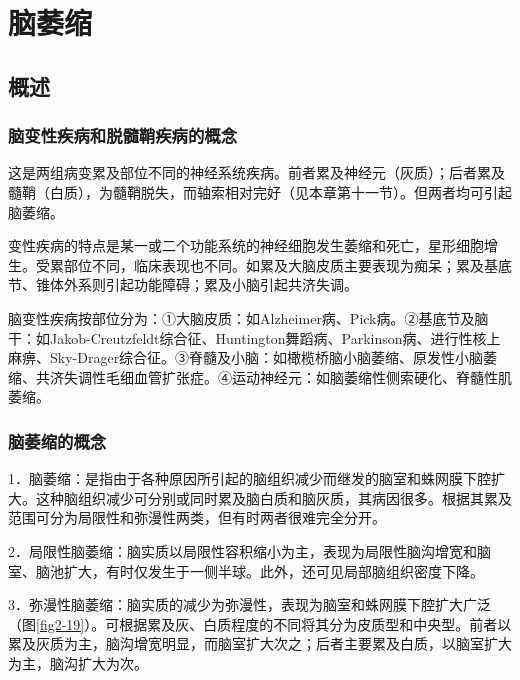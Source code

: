 \section{脑萎缩}

\subsection{概述}

\subsubsection{脑变性疾病和脱髓鞘疾病的概念}

这是两组病变累及部位不同的神经系统疾病。前者累及神经元（灰质）；后者累及髓鞘（白质），为髓鞘脱失，而轴索相对完好（见本章第十一节）。但两者均可引起脑萎缩。

变性疾病的特点是某一或二个功能系统的神经细胞发生萎缩和死亡，星形细胞增生。受累部位不同，临床表现也不同。如累及大脑皮质主要表现为痴呆；累及基底节、锥体外系则引起功能障碍；累及小脑引起共济失调。

脑变性疾病按部位分为：①大脑皮质：如Alzheimer病、Pick病。②基底节及脑干：如Jakob-Creutzfeldt综合征、Huntington舞蹈病、Parkinson病、进行性核上麻痹、Sky-Drager综合征。③脊髓及小脑：如橄榄桥脑小脑萎缩、原发性小脑萎缩、共济失调性毛细血管扩张症。④运动神经元：如脑萎缩性侧索硬化、脊髓性肌萎缩。

\subsubsection{脑萎缩的概念}

1．脑萎缩：是指由于各种原因所引起的脑组织减少而继发的脑室和蛛网膜下腔扩大。这种脑组织减少可分别或同时累及脑白质和脑灰质，其病因很多。根据其累及范围可分为局限性和弥漫性两类，但有时两者很难完全分开。

2．局限性脑萎缩：脑实质以局限性容积缩小为主，表现为局限性脑沟增宽和脑室、脑池扩大，有时仅发生于一侧半球。此外，还可见局部脑组织密度下降。

3．弥漫性脑萎缩：脑实质的减少为弥漫性，表现为脑室和蛛网膜下腔扩大广泛（图\ref{fig2-19}）。可根据累及灰、白质程度的不同将其分为皮质型和中央型。前者以累及灰质为主，脑沟增宽明显，而脑室扩大次之；后者主要累及白质，以脑室扩大为主，脑沟扩大为次。

